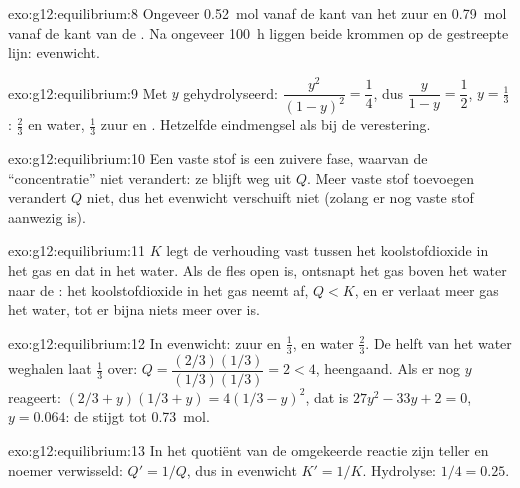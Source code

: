 \begin{solution}{exo:g12:equilibrium:8}
Ongeveer \qty{0.52}{mol} vanaf de kant van het zuur en \qty{0.79}{mol}
vanaf de kant van de . Na ongeveer \qty{100}{h} liggen beide krommen
op de gestreepte lijn: evenwicht.
\end{solution}

\begin{solution}{exo:g12:equilibrium:9}
Met $y$  gehydrolyseerd: $\dfrac{y^2}{(1-y)^2} = \dfrac{1}{4}$, dus
$\dfrac{y}{1-y} = \dfrac{1}{2}$, $y = \frac{1}{3}$: $\frac{2}{3}$ 
 en water, $\frac{1}{3}$  zuur en . Hetzelfde eindmengsel
als bij de verestering.
\end{solution}

\begin{solution}{exo:g12:equilibrium:10}
Een vaste stof is een zuivere fase, waarvan de ``concentratie'' niet
verandert: ze blijft weg uit $Q$. Meer vaste stof toevoegen verandert $Q$
niet, dus het evenwicht verschuift niet (zolang er nog vaste stof
aanwezig is).
\end{solution}

\begin{solution}{exo:g12:equilibrium:11}
$K$ legt de verhouding vast tussen het koolstofdioxide in het gas en dat
in het water. Als de fles open is, ontsnapt het gas boven het water naar
de : het koolstofdioxide in het gas neemt af, $Q < K$, en er verlaat
meer gas het water, tot er bijna niets meer over is.
\end{solution}

\begin{solution}{exo:g12:equilibrium:12}
In evenwicht: zuur en  $\frac{1}{3}$,  en water
$\frac{2}{3}$. De helft van het water weghalen laat $\frac{1}{3}$ over:
$Q = \dfrac{(2/3)(1/3)}{(1/3)(1/3)} = 2 < 4$, heengaand. Als er nog $y$
reageert: $(2/3 + y)(1/3 + y) = 4(1/3 - y)^2$, dat is
$27y^2 - 33y + 2 = 0$, $y = 0.064$: de  stijgt tot \qty{0.73}{mol}.
\end{solution}

\begin{solution}{exo:g12:equilibrium:13}
In het quotiënt van de omgekeerde reactie zijn teller en noemer
verwisseld: $Q' = 1/Q$, dus in evenwicht $K' = 1/K$. Hydrolyse:
$1/4 = 0.25$.
\end{solution}

